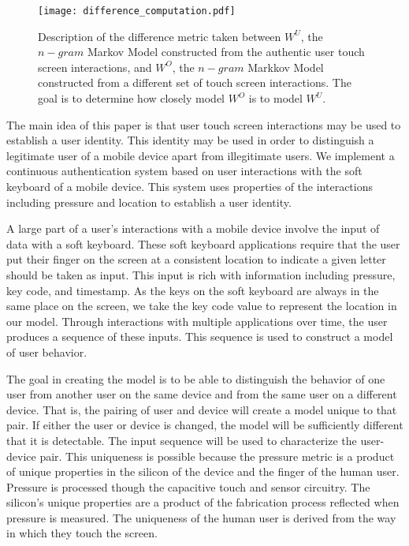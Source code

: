 \begin{figure*}
\centering
\texttt{[image: difference\_computation.pdf]}
\caption{
Description of the difference metric taken between
$W^U$, the $n-gram$ Markov Model constructed from the authentic user touch screen interactions,
and $W^O$, the $n-gram$ Markkov Model constructed 
from a different set of touch screen interactions.
%
The goal is to determine how closely model $W^O$ is to model $W^U$.
}
\label{fig:difference_computation}
\end{figure*}

The main idea of this paper is that user
touch screen interactions may be used 
to establish a user identity.
%
This identity may be used in order to
distinguish a legitimate user of a mobile device apart from
illegitimate users.
%
We implement a continuous authentication system
based on user interactions with the soft keyboard of
a mobile device.
This system uses properties of the interactions including
pressure and location
to establish a user identity.

A large part of a user's interactions with a mobile
device involve the input of data with a soft keyboard.
These soft keyboard applications require that
the user put their finger on the screen at a consistent
location to indicate a given letter should be taken as input.
This input is rich with information including
pressure,
key code, and
timestamp.
As the keys on the soft keyboard are always in the same place on the screen,
we take the key code value to represent the location in our model.
Through interactions with multiple applications over time,
the user produces a sequence of these inputs.
This sequence is used to construct a model of user behavior.

The goal in creating the model
is to be able to distinguish the behavior
of one user from 
another user on the same device and
from the same user on a different device.
That is, the pairing of user and device will
create a model unique to that pair.
If either the user or device is changed,
the model will be sufficiently different
that it is detectable.
The input sequence will be used to characterize the user-device pair.
%
This uniqueness is possible because
the pressure metric is a product of 
unique properties in
the silicon of the device and
the finger of the human user.
%
Pressure is processed though the capacitive touch and sensor circuitry.
The silicon's unique properties
are a product of the fabrication process %
reflected when pressure is measured.
The uniqueness of the human user is derived from
the way in which they touch the screen.

